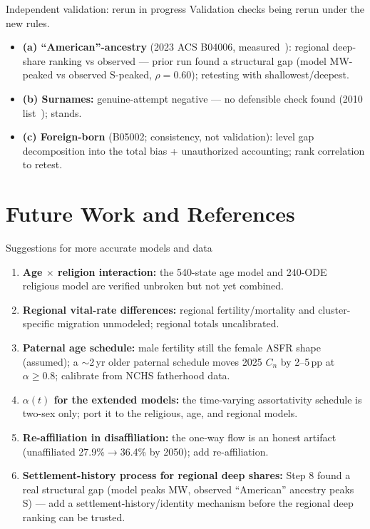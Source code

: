 \documentclass[10pt]{beamer}
\begin{document}
\begin{frame}{Independent validation: rerun in progress}
  \centering
  {\large\color{nmgray} Validation checks being rerun under the new rules.}

  \vspace{1em}
  {\small
  \begin{itemize}
    \item \textbf{(a) ``American''-ancestry} (2023 ACS B04006, measured~\cite{acs-2023-b04006-b05002}): regional deep-share ranking vs observed --- prior run found a structural gap (model MW-peaked vs observed S-peaked, $\rho{=}0.60$); retesting with shallowest/deepest.
    \item \textbf{(b) Surnames:} genuine-attempt negative --- no defensible check found (2010 list~\cite{census-surnames-2010}); stands.
    \item \textbf{(c) Foreign-born} (B05002; consistency, not validation): level gap decomposition into the total bias + unauthorized accounting; rank correlation to retest.
  \end{itemize}}
\end{frame}

\section{Future Work and References}

\begin{frame}{Suggestions for more accurate models and data}
  \small
  \begin{enumerate}
    \item \textbf{Age $\times$ religion interaction:} the 540-state age model and 240-ODE religious model are verified unbroken but not yet combined.
    \item \textbf{Regional vital-rate differences:} regional fertility/mortality and cluster-specific migration unmodeled; regional totals uncalibrated.
    \item \textbf{Paternal age schedule:} male fertility still the female ASFR shape (assumed); a $\sim$2\,yr older paternal schedule moves 2025 $C_n$ by 2--5\,pp at $\alpha\ge0.8$; calibrate from NCHS fatherhood data.
    \item \textbf{$\alpha(t)$ for the extended models:} the time-varying assortativity schedule is two-sex only; port it to the religious, age, and regional models.
    \item \textbf{Re-affiliation in disaffiliation:} the one-way flow is an honest artifact (unaffiliated 27.9\%$\to$36.4\% by 2050); add re-affiliation.
    \item \textbf{Settlement-history process for regional deep shares:} Step 8 found a real structural gap (model peaks MW, observed ``American'' ancestry peaks S) --- add a settlement-history/identity mechanism before the regional deep ranking can be trusted.
  \end{enumerate}
\end{frame}
\end{document}
